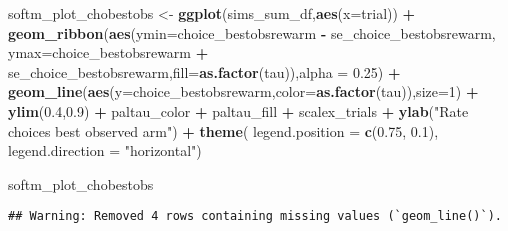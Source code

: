 \documentclass[
]{article}
\newenvironment{Shaded}{\begin{snugshade}}{\end{snugshade}}
\newcommand{\AttributeTok}[1]{\textcolor[rgb]{0.13,0.29,0.53}{#1}}
\newcommand{\DecValTok}[1]{\textcolor[rgb]{0.00,0.00,0.81}{#1}}
\newcommand{\FloatTok}[1]{\textcolor[rgb]{0.00,0.00,0.81}{#1}}
\newcommand{\FunctionTok}[1]{\textcolor[rgb]{0.13,0.29,0.53}{\textbf{#1}}}
\newcommand{\NormalTok}[1]{#1}
\newcommand{\OtherTok}[1]{\textcolor[rgb]{0.56,0.35,0.01}{#1}}
\newcommand{\SpecialCharTok}[1]{\textcolor[rgb]{0.81,0.36,0.00}{\textbf{#1}}}
\newcommand{\StringTok}[1]{\textcolor[rgb]{0.31,0.60,0.02}{#1}}
\begin{document}
\begin{Shaded}
\begin{Highlighting}[]
\NormalTok{softm\_plot\_chobestobs }\OtherTok{\textless{}{-}} \FunctionTok{ggplot}\NormalTok{(sims\_sum\_df,}\FunctionTok{aes}\NormalTok{(}\AttributeTok{x=}\NormalTok{trial)) }\SpecialCharTok{+} 
  \FunctionTok{geom\_ribbon}\NormalTok{(}\FunctionTok{aes}\NormalTok{(}\AttributeTok{ymin=}\NormalTok{choice\_bestobsrewarm }\SpecialCharTok{{-}}\NormalTok{ se\_choice\_bestobsrewarm, }\AttributeTok{ymax=}\NormalTok{choice\_bestobsrewarm }\SpecialCharTok{+}\NormalTok{ se\_choice\_bestobsrewarm,}\AttributeTok{fill=}\FunctionTok{as.factor}\NormalTok{(tau)),}\AttributeTok{alpha =} \FloatTok{0.25}\NormalTok{) }\SpecialCharTok{+}
  \FunctionTok{geom\_line}\NormalTok{(}\FunctionTok{aes}\NormalTok{(}\AttributeTok{y=}\NormalTok{choice\_bestobsrewarm,}\AttributeTok{color=}\FunctionTok{as.factor}\NormalTok{(tau)),}\AttributeTok{size=}\DecValTok{1}\NormalTok{) }\SpecialCharTok{+}
  \FunctionTok{ylim}\NormalTok{(}\FloatTok{0.4}\NormalTok{,}\FloatTok{0.9}\NormalTok{) }\SpecialCharTok{+} 
\NormalTok{  paltau\_color }\SpecialCharTok{+} 
\NormalTok{  paltau\_fill }\SpecialCharTok{+} 
\NormalTok{  scalex\_trials }\SpecialCharTok{+}
  \FunctionTok{ylab}\NormalTok{(}\StringTok{"Rate choices best observed arm"}\NormalTok{) }\SpecialCharTok{+}
  \FunctionTok{theme}\NormalTok{(}
    \AttributeTok{legend.position =} \FunctionTok{c}\NormalTok{(}\FloatTok{0.75}\NormalTok{, }\FloatTok{0.1}\NormalTok{),}
    \AttributeTok{legend.direction =} \StringTok{"horizontal"}\NormalTok{)}

\NormalTok{softm\_plot\_chobestobs}
\end{Highlighting}
\end{Shaded}

\begin{verbatim}
## Warning: Removed 4 rows containing missing values (`geom_line()`).
\end{verbatim}
\end{document}
